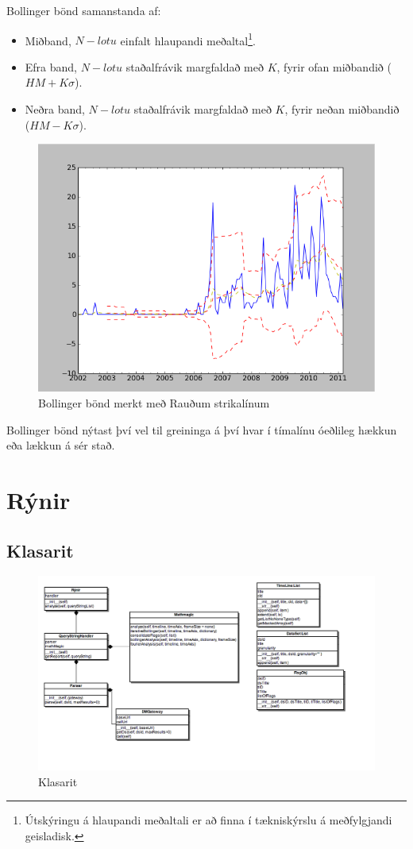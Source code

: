 \documentclass{article}
\begin{document}
Bollinger bönd samanstanda af:
\begin{itemize}
  \item Miðband, $N-lotu$ einfalt hlaupandi meðaltal\footnote[1]{Útskýringu á hlaupandi meðaltali er að finna í tækniskýrslu á meðfylgjandi geisladisk.}.
  \item Efra band, $N-lotu$ staðalfrávik margfaldað með $K$, fyrir ofan
miðbandið ($HM + K\sigma$).
  \item Neðra band, $N-lotu$ staðalfrávik margfaldað með $K$, fyrir neðan
miðbandið ($HM -K\sigma$).
\end{itemize}


\begin{figure}[H]
  \centering
  \includegraphics[width=.58\textwidth]{Bollinger.png} 
  \caption{Bollinger bönd merkt með Rauðum strikalínum} 
\end{figure}


Bollinger bönd nýtast því vel til greininga á því hvar í
tímalínu óeðlileg hækkun eða lækkun á sér stað.






\section{Rýnir}
\label{sec:implementation}

\subsection{Klasarit}
\label{sec:class_diagram}

\begin{figure}[H]
  \centering
  \includegraphics[width=.75\textwidth]{rynir_class_diagram.png} 
  \caption{Klasarit} 
\end{figure}
\end{document}
